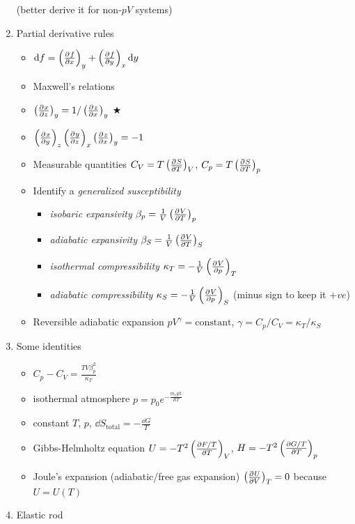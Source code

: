 \documentclass{article}
\theoremstyle{remark}
\newcommand{\mylabel}[2]{\hyperref[#1]{#2}\label{back:#1}}
\newcommand{\ppdv}[4][]{\left(\pdv[#1]{#2}{#3}\right)_{#4}}
\begin{document}
\begin{enumerate}
        (better derive it for non-$pV$ systems)
    \item Partial derivative rules\begin{itemize}
            \item $\dd f=\ppdv{f}{x}{y}+\ppdv{f}{y}{x}\dd y$
            \item Maxwell's relations
            \item $\ppdv{x}{z}{y}=1/\ppdv{z}{x}{y}$ \mylabel{reciprocity_relations}{$\bigstar$}
            \item $\ppdv{x}{y}{z}\ppdv{y}{z}{x}\ppdv{z}{x}{y}=-1$
            \item Measurable quantities $C_V=T\ppdv{S}{T}{V}$, $C_p=T\ppdv{S}{T}{p}$
            \item Identify a \emph{generalized susceptibility}\begin{itemize}
                \item \emph{isobaric expansivity} $\beta_p=\frac{1}{V}\ppdv{V}{T}{p}$
                \item \emph{adiabatic expansivity} $\beta_S=\frac{1}{V}\ppdv{V}{T}{S}$
                \item \emph{isothermal compressibility} $\kappa_T=-\frac{1}{V}\ppdv{V}{p}{T}$
                \item \emph{adiabatic compressibility} $\kappa_S=-\frac{1}{V}\ppdv{V}{p}{S}$ (minus sign to keep it $+ve$)
            \end{itemize}
            \item Reversible adiabatic expansion $\boxed{pV^\gamma=\text{constant}}$, $\gamma=C_p/C_V=\kappa_T/\kappa_S$
        \end{itemize}
    \item Some identities\begin{itemize}
            \item $C_p-C_V=\frac{TV\beta_p^2}{\kappa_T}$
            \item isothermal atmosphere $p=p_0e^{-\frac{m_rgh}{RT}}$
            \item constant $T$, $p$, $\dd S_{\text{total}}=-\frac{\dd G}{T}$
            \item Gibbs-Helmholtz equation $U=-T^2\left(\pdv{F/T}{T}\right)_V$, $H=-T^2\left(\pdv{G/T}{T}\right)_p$
            \item Joule's expansion (adiabatic/free gas expansion) $\ppdv{U}{V}{T}=0$ because $U=U(T)$
        \end{itemize}
    \item Elastic rod\begin{itemize}

\end{itemize}
\end{enumerate}
\end{document}
